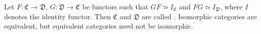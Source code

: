 Let $F: \mathfrak{C} \to \mathfrak{D}$, $G: \mathfrak{D} \to \mathfrak{C}$ be functors such that $GF \simeq I_{\mathfrak{C}}$ and $FG \simeq I_{\mathfrak{D}}$, where $I$ denotes the identity functor. Then $\mathfrak{C}$ and $\mathfrak{D}$ are called . Isomorphic categories are equivalent, but equivalent categories need not be isomorphic.
